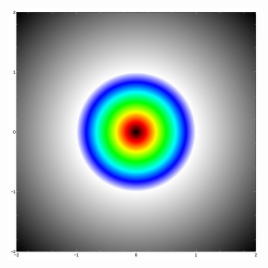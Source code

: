 \documentclass{beamer}
\begin{document}
\begin{frame}
\begin{columns}
\begin{column}{0.5\textwidth}
    \includegraphics[width=0.5\textwidth, right]{implicit_circle.jpg}
  \end{column}
\end{columns}
\end{frame}
\end{document}
